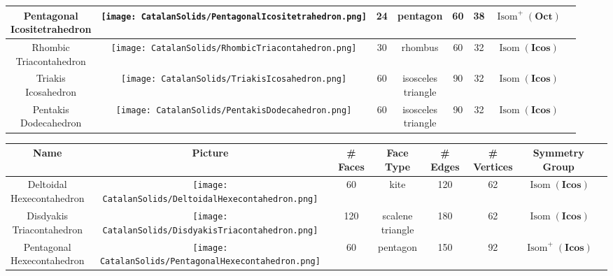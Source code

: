 \documentclass[leqno]{book}
\begin{document}
\begin{center}
\begin{tabular}{cccccccc}
\parbox{2.5cm}{Pentagonal\\Icositetrahedron}&
\texttt{[image: CatalanSolids/PentagonalIcositetrahedron.png]}&
24&
pentagon&
60&
38&
$\operatorname{Isom}^+(\mathbf{Oct})$\\\hline

\parbox{2.5cm}{Rhombic\\Triacontahedron}&
\texttt{[image: CatalanSolids/RhombicTriacontahedron.png]}&
30&
rhombus&
60&
32&
$\operatorname{Isom}(\mathbf{Icos})$\\\hline

\parbox{2.5cm}{Triakis\\Icosahedron}&
\texttt{[image: CatalanSolids/TriakisIcosahedron.png]}&
60&
\parbox{2cm}{isosceles\\triangle}&
90&
32&
$\operatorname{Isom}(\mathbf{Icos})$\\\hline

\parbox{2.5cm}{Pentakis\\Dodecahedron}&
\texttt{[image: CatalanSolids/PentakisDodecahedron.png]}&
60&
\parbox{2cm}{isosceles\\triangle}&
90&
32&
$\operatorname{Isom}(\mathbf{Icos})$\\\hline
\end{tabular}

\begin{tabular}{cccccccc}
Name&Picture&\# Faces&Face Type&\# Edges&\# Vertices&\parbox{2cm}{Symmetry\\Group}\\\hline\hline

\parbox{2.5cm}{Deltoidal\\Hexecontahedron}&
\texttt{[image: CatalanSolids/DeltoidalHexecontahedron.png]}&
60&
kite&
120&
62&
$\operatorname{Isom}(\mathbf{Icos})$\\\hline

\parbox{2.5cm}{Disdyakis\\Triacontahedron}&
\texttt{[image: CatalanSolids/DisdyakisTriacontahedron.png]}&
120&
\parbox{2cm}{scalene\\triangle}&
180&
62&
$\operatorname{Isom}(\mathbf{Icos})$\\\hline

\parbox{2.5cm}{Pentagonal\\Hexecontahedron}&
\texttt{[image: CatalanSolids/PentagonalHexecontahedron.png]}&
60&
pentagon&
150&
92&
$\operatorname{Isom}^+(\mathbf{Icos})$\\\hline
\end{tabular}
\end{center}
\end{document}
